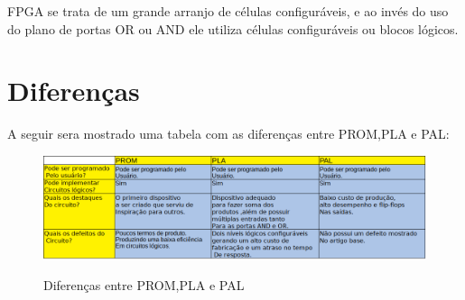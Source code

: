  
FPGA se trata de um grande arranjo de células configuráveis, e ao invés do uso do plano de portas OR ou AND ele utiliza células configuráveis ou blocos lógicos.

\section{\esp Diferenças}

A seguir sera mostrado uma tabela com as diferenças entre PROM,PLA e PAL:

\begin{figure}[ht]
	\centering	
	\caption[\hspace{0.1cm}Diferenças.]{Diferenças entre PROM,PLA e PAL}
	\vspace{-0.4cm}
	\includegraphics[width=1.0\textwidth]{figuras/dif.png}
	 \vspace{-0.2cm}
	\label{fig:figura1}
\end{figure}
\vspace{-0.5cm}

